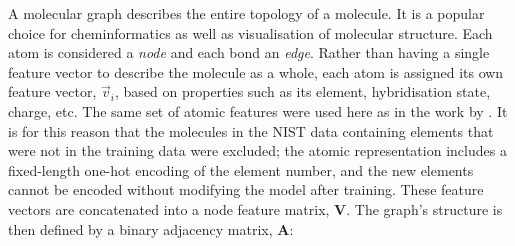 




A molecular graph describes the entire topology of a molecule. It is a
popular choice for cheminformatics as well as visualisation of molecular
structure. Each atom is considered a \emph{node} and each bond an \emph{edge}.
Rather than having a single feature vector to describe the molecule as a whole,
each atom is assigned its own feature vector, $\vec{v}_i$, based on properties
such as its element, hybridisation state, charge, etc. The same set of atomic
features were used here as in the work by
\citet{qinPredictingCriticalMicelle2021}. It is for this reason that the
molecules in the NIST data containing elements that were not in the training
data were excluded; the atomic representation includes a fixed-length one-hot
encoding of the element number, and the new elements cannot be encoded without
modifying the model after training. These feature vectors are concatenated into
a node feature matrix, $\mathbf{V}$. The graph's structure is then defined by a
binary adjacency matrix, $\mathbf{A}$:


